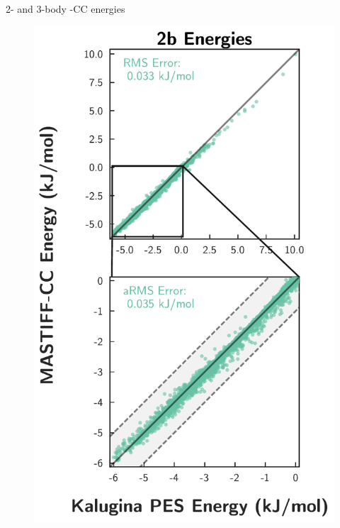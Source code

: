 \begin{section}{2- and 3-body \mastiff-CC \texorpdfstring{\co} {} energies}
    \begin{figure}
      \centering
      \begin{minipage}[b]{0.4\textwidth}
      \includegraphics[height=2\textwidth]{anisotropic/si/co2_snapshots/dimer_snapshot/co2_dimer_comparison.pdf}

\end{minipage}
\end{figure}
\end{section}
